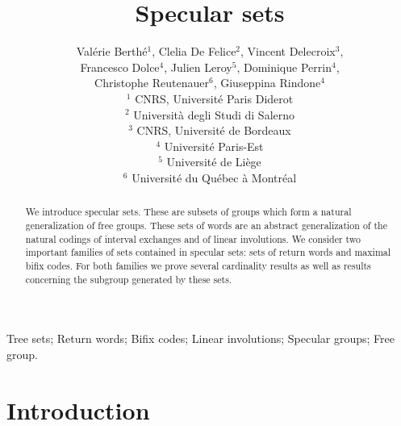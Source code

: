 \documentclass[preprint,12pt]{elsarticle}
\numberwithin{theorem}{section}
\numberwithin{equation}{section}
\numberwithin{figure}{section}
\numberwithin{table}{section}
\begin{document}
\begin{frontmatter}

\title{Specular sets}

\author{Val\'erie Berth\'e$^1$, Clelia De Felice$^2$, Vincent Delecroix$^3$, \\ Francesco Dolce$^4$, Julien Leroy$^5$, Dominique Perrin$^4$, \\ Christophe Reutenauer$^6$, Giuseppina Rindone$^4$ \\ $\,$\\ $^1$ CNRS, Universit\'e Paris Diderot \\ $^2$ Universit\`a degli Studi di Salerno \\ $^3$ CNRS, Universit\'e de Bordeaux \\ $^4$ Universit\'e Paris-Est \\ $^5$ Universit\'e de Li\`ege \\ $^6$ Universit\'e du Qu\'ebec \`a Montr\'eal}

\begin{abstract}
We introduce specular sets.
These are subsets of groups which form a natural generalization of free groups.
These sets of words are an abstract generalization of the natural codings of interval exchanges and of linear involutions.
We consider two important families of sets contained in specular sets: sets of return words and maximal bifix codes.
For both families we prove several cardinality results as well as results concerning the subgroup generated by these sets.
\end{abstract}

\begin{keyword}
Tree sets; Return words; Bifix codes; Linear involutions; Specular groups; Free group.
\end{keyword}


\end{frontmatter}







\tableofcontents





\section{Introduction}
\end{document}
